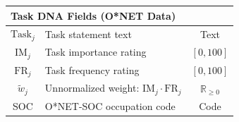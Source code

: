 \begin{longtable}{clc}
\multicolumn{3}{l}{\textbf{Task DNA Fields (O*NET Data)}} \\
\midrule
$\text{Task}_j$ & Task statement text & Text \\
$\text{IM}_j$ & Task importance rating & $[0,100]$ \\
$\text{FR}_j$ & Task frequency rating & $[0,100]$ \\
$\tilde{w}_j$ & Unnormalized weight: $\text{IM}_j \cdot \text{FR}_j$ & $\mathbb{R}_{\ge 0}$ \\
SOC & O*NET-SOC occupation code & Code \\

\end{longtable}

